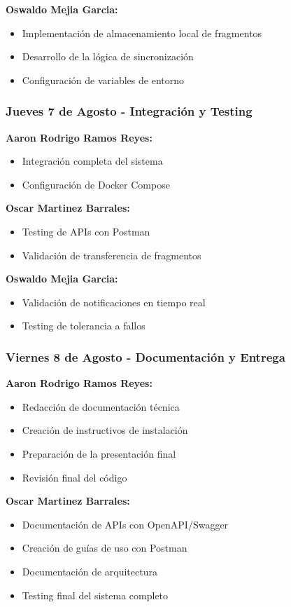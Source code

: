 \textbf{Oswaldo Mejia Garcia:}
\begin{itemize}
    \item Implementación de almacenamiento local de fragmentos
    \item Desarrollo de la lógica de sincronización
    \item Configuración de variables de entorno
\end{itemize}

\subsubsection*{Jueves 7 de Agosto - Integración y Testing}

\textbf{Aaron Rodrigo Ramos Reyes:}
\begin{itemize}
    \item Integración completa del sistema
    \item Configuración de Docker Compose
\end{itemize}

\textbf{Oscar Martinez Barrales:}
\begin{itemize}
    \item Testing de APIs con Postman
    \item Validación de transferencia de fragmentos
\end{itemize}

\textbf{Oswaldo Mejia Garcia:}
\begin{itemize}
    \item Validación de notificaciones en tiempo real
    \item Testing de tolerancia a fallos
\end{itemize}

\subsubsection*{Viernes 8 de Agosto - Documentación y Entrega}

\textbf{Aaron Rodrigo Ramos Reyes:}
\begin{itemize}
    \item Redacción de documentación técnica
    \item Creación de instructivos de instalación
    \item Preparación de la presentación final
    \item Revisión final del código
\end{itemize}

\textbf{Oscar Martinez Barrales:}
\begin{itemize}
    \item Documentación de APIs con OpenAPI/Swagger
    \item Creación de guías de uso con Postman
    \item Documentación de arquitectura
    \item Testing final del sistema completo
\end{itemize}

